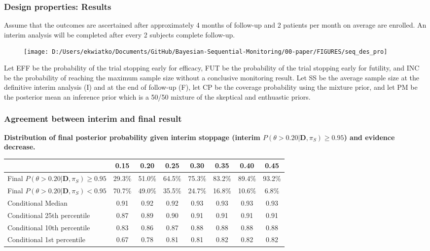 \documentclass[12pt]{article}
\begin{document}
\subsubsection{Design properties: Results}
Assume that the outcomes are ascertained after approximately 4 months of follow-up and 2 patients per month on average are enrolled. An interim analysis will be completed after every 2 subjects complete follow-up.
\begin{figure}
\texttt{[image: D:/Users/ekwiatko/Documents/GitHub/Bayesian-Sequential-Monitoring/00-paper/FIGURES/seq\_des\_pro]}
\caption{}
\end{figure}
Let EFF be the probability of the trial stopping early for efficacy, FUT be the probability of the trial stopping early for futility, and INC be the probability of reaching the maximum sample size without a conclusive monitoring result. Let SS be the average sample size at the definitive interim analysis (I) and at the end of follow-up (F), let CP be the coverage probability using the mixture prior, and let PM be the posterior mean an inference prior which is a 50/50 mixture of the skeptical and enthuastic priors.
\newpage
\subsubsection{Agreement between interim and final result}
\begin{center}
\textbf{Distribution of final posterior probability given interim stoppage (interim $P(\theta>0.20|\mathbf{D},\pi_S)\geq 0.95$) and evidence decrease.}
\begin{tabular}{l|ccccccc}
&0.15&0.20&0.25&0.30&0.35&0.40&0.45\\
\hline
Final $P(\theta>0.20|\mathbf{D},\pi_S)\geq 0.95$ &29.3\%&51.0\%&64.5\%&75.3\%&83.2\%&89.4\%&93.2\% \\ 
Final $P(\theta>0.20|\mathbf{D},\pi_S)< 0.95$&70.7\%&49.0\%&35.5\%&24.7\%&16.8\%&10.6\%&6.8\%\\  
\hspace{0.5in}Conditional Median&0.91&0.92&0.92&0.93&0.93&0.93&0.93\\  
\hspace{0.5in}Conditional 25th percentile&0.87&0.89&0.90&0.91&0.91&0.91&0.91\\  
\hspace{0.5in}Conditional 10th percentile&0.83&0.86&0.87&0.88&0.88&0.88&0.88\\  
\hspace{0.5in}Conditional 1st percentile&0.67&0.78&0.81&0.81&0.82&0.82&0.82
\end{tabular}
\end{center}
\end{document}
